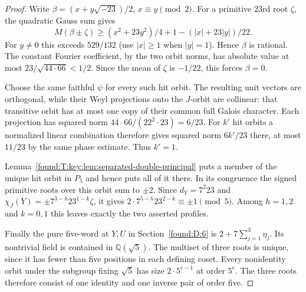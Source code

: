\documentclass[11pt,a4paper]{article}
\numberwithin{equation}{section}
\theoremstyle{remark}
\begin{document}
\begin{proof}
Write $\beta=(x+y\sqrt{-23})/2$, $x\equiv y\pmod2$. For a
primitive $23$rd root $\zeta$, the quadratic Gauss sum gives
\[
 M(\beta\pm\zeta)\ge
   (x^2+23y^2)/4+1-(|x|+23|y|)/22.
\]
For $y\ne0$ this exceeds $529/132$ (use $|x|\ge1$ when
$|y|=1$). Hence $\beta$ is rational. The constant Fourier
coefficient, by the two orbit norms, has absolute value at most
$23/\sqrt{44\cdot66}<1/2$. Since the mean of $\zeta$ is $-1/22$,
this forces $\beta=0$.

Choose the same faithful $\psi$ for every such hit orbit. The
resulting unit vectors are orthogonal, while their Weyl projections
onto the $J$-orbit are collinear: that transitive orbit has at most
one copy of their common full Galois character. Each projection has
squared norm $44\cdot66/(22^2\cdot23)=6/23$. For $k'$ hit orbits
a normalized linear combination therefore gives squared norm
$6k'/23$ there, at most $11/23$ by the same phase estimate. Thus
$k'=1$.

Lemma~\ref{found:T:key:lem:separated-double-principal} puts a member of the
unique hit orbit in $P_5$ and hence puts all of it there. In its
congruence the signed primitive roots over this orbit sum to
$\pm2$. Since $d_Y=7^2 23$ and
$\chi_J(Y)=\pm7^{3-h}23^{1-k}\zeta$, it gives
$2\cdot7^{5-h}23^{2-k}\equiv\pm1\pmod5$. Among $h=1,2$ and
$k=0,1$ this leaves exactly the two asserted profiles.

Finally the pure five-word at $Y,U$ in
Section~\ref{found:D:6} is $2+7\sum_{j=1}^3\eta_j$. Its nontrivial field
is contained in $\mathbb Q(\sqrt5)$. The multiset of three roots
is unique, since it has fewer than five positions in each defining
coset. Every nonidentity orbit under the subgroup fixing $\sqrt5$
has size $2\cdot5^{e-1}$ at order $5^e$. The three roots therefore
consist of one identity and one inverse pair of order five.
\end{proof}
\end{document}
